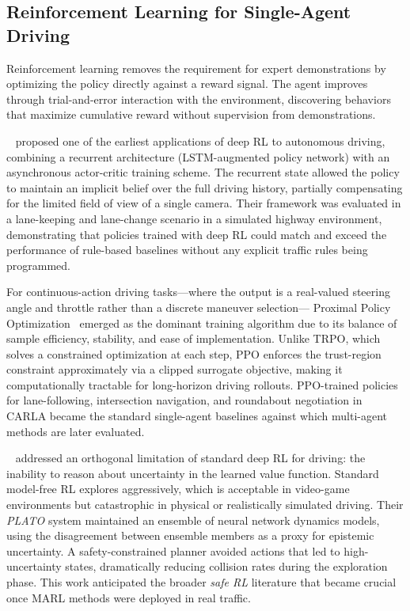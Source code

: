 \documentclass[12pt, a4paper]{article}
\begin{document}
\subsection{Reinforcement Learning for Single-Agent Driving}
\label{sec:rl_single}

Reinforcement learning removes the requirement for expert demonstrations by
optimizing the policy directly against a reward signal.  The agent improves
through trial-and-error interaction with the environment, discovering
behaviors that maximize cumulative reward without supervision from
demonstrations.

\citeauthor{sallab2017deep}~\cite{sallab2017deep} proposed one of the earliest
applications of deep RL to autonomous driving, combining a recurrent
architecture (LSTM-augmented policy network) with an asynchronous actor-critic
training scheme.  The recurrent state allowed the policy to maintain an
implicit belief over the full driving history, partially compensating for the
limited field of view of a single camera.  Their framework was evaluated in a
lane-keeping and lane-change scenario in a simulated highway environment,
demonstrating that policies trained with deep RL could match and exceed the
performance of rule-based baselines without any explicit traffic rules being
programmed.

For continuous-action driving tasks---where the output is a real-valued
steering angle and throttle rather than a discrete maneuver selection---
Proximal Policy Optimization~\cite{schulman2017proximal} emerged as the
dominant training algorithm due to its balance of sample efficiency, stability,
and ease of implementation.  Unlike TRPO, which solves a constrained
optimization at each step, PPO enforces the trust-region constraint
approximately via a clipped surrogate objective, making it computationally
tractable for long-horizon driving rollouts.  PPO-trained policies for
lane-following, intersection navigation, and roundabout negotiation in CARLA
became the standard single-agent baselines against which multi-agent methods
are later evaluated.

\citeauthor{kahn2017uncertainty}~\cite{kahn2017uncertainty} addressed an
orthogonal limitation of standard deep RL for driving: the inability to reason
about uncertainty in the learned value function.  Standard model-free RL
explores aggressively, which is acceptable in video-game environments but
catastrophic in physical or realistically simulated driving.  Their
\emph{PLATO} system maintained an ensemble of neural network dynamics models,
using the disagreement between ensemble members as a proxy for epistemic
uncertainty.  A safety-constrained planner avoided actions that led to
high-uncertainty states, dramatically reducing collision rates during the
exploration phase.  This work anticipated the broader \emph{safe RL}
literature that became crucial once MARL methods were deployed in real traffic.
\end{document}

